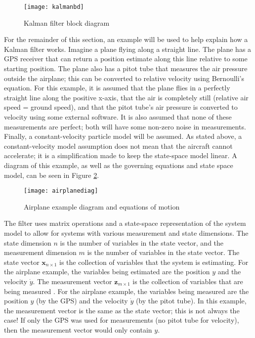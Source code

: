 \documentclass[12pt,a4paper]{report}
\begin{document}
\pagebreak

\begin{figure}[htbp]
	\centering
	\texttt{[image: kalmanbd]}
	\caption{Kalman filter block diagram \cite{kfsimply}}
	\label{fig:kalmanbd}
\end{figure}

For the remainder of this section, an example will be used to help explain how a Kalman filter works. Imagine a plane flying along a straight line. The plane has a GPS receiver that can return a position estimate along this line relative to some starting position. The plane also has a pitot tube that measures the air pressure outside the airplane; this can be converted to relative velocity using Bernoulli’s equation. For this example, it is assumed that the plane flies in a perfectly straight line along the positive x-axis, that the air is completely still (relative air speed = ground speed), and that the pitot tube’s air pressure is converted to velocity using some external software. It is also assumed that none of these measurements are perfect; both will have some non-zero noise in measurements. Finally, a constant-velocity particle model will be assumed. As stated above, a constant-velocity model assumption does not mean that the aircraft cannot accelerate; it is a simplification made to keep the state-space model linear. A diagram of this example, as well as the governing equations and state space model, can be seen in Figure \ref{fig:airplanediag}.

\begin{figure}[htbp]
	\centering
	\texttt{[image: airplanediag]}
	\caption{Airplane example diagram and equations of motion}
	\label{fig:airplanediag}
\end{figure}

The filter uses matrix operations and a state-space representation of the system model to allow for systems with various measurement and state dimensions. The state dimension \(n\) is the number of variables in the state vector, and the measurement dimension \(m\) is the number of variables in the state vector. The state vector \(\mathbf{x}_{n \times 1}\) is the collection of variables that the system is estimating. For the airplane example, the variables being estimated are the position \(y\) and the velocity \(\dot{y}\). The measurement vector \(\mathbf{z}_{m \times 1}\) is the collection of variables that are being measured \cite{kfsimply}. For the airplane example, the variables being measured are the position \(y\) (by the GPS) and the velocity \(\dot{y}\) (by the pitot tube). In this example, the measurement vector is the same as the state vector; this is not always the case! If only the GPS was used for measurements (no pitot tube for velocity), then the measurement vector would only contain \(y\).
\end{document}

